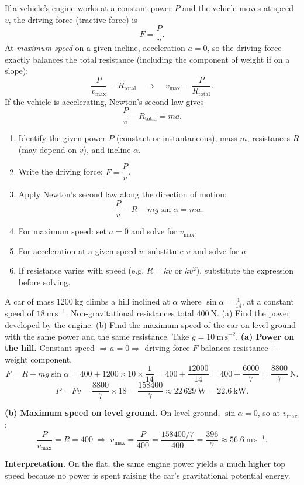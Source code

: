 \documentclass[11pt]{article}
\begin{document}
\begin{propriete}
If a vehicle's engine works at a constant power $P$ and the vehicle moves at speed $v$, the driving force (tractive force) is
\[
F = \frac{P}{v}.
\]
At \emph{maximum speed} on a given incline, acceleration $a = 0$, so the driving force exactly balances the total resistance (including the component of weight if on a slope):
\[
\frac{P}{v_{\max}} = R_{\text{total}} \quad\Longrightarrow\quad v_{\max} = \frac{P}{R_{\text{total}}}.
\]
If the vehicle is accelerating, Newton's second law gives
\[
\frac{P}{v} - R_{\text{total}} = ma.
\]
\end{propriete}

\begin{methode}
\begin{enumerate}
\item Identify the given power $P$ (constant or instantaneous), mass $m$, resistances $R$ (may depend on $v$), and incline $\alpha$.
\item Write the driving force: $F = \dfrac{P}{v}$.
\item Apply Newton's second law along the direction of motion:
\[
\frac{P}{v} - R - mg\sin\alpha = ma.
\]
\item For maximum speed: set $a = 0$ and solve for $v_{\max}$.
\item For acceleration at a given speed $v$: substitute $v$ and solve for $a$.
\item If resistance varies with speed (e.g. $R = kv$ or $kv^2$), substitute the expression before solving.
\end{enumerate}
\end{methode}

\begin{exoresolu}
A car of mass $1200\ \mathrm{kg}$ climbs a hill inclined at $\alpha$ where $\sin\alpha = \frac{1}{14}$, at a constant speed of $18\ \mathrm{m\,s^{-1}}$. Non-gravitational resistances total $400\ \mathrm{N}$. (a) Find the power developed by the engine. (b) Find the maximum speed of the car on level ground with the same power and the same resistance. Take $g = 10\ \mathrm{m\,s^{-2}}$.
\tcblower
\textbf{(a) Power on the hill.} Constant speed $\Rightarrow a=0 \Rightarrow$ driving force $F$ balances resistance + weight component.
\[
F = R + mg\sin\alpha = 400 + 1200 \times 10 \times \frac{1}{14} = 400 + \frac{12000}{14} = 400 + \frac{6000}{7} = \frac{8800}{7}\ \mathrm{N}.
\]
\[
P = Fv = \frac{8800}{7} \times 18 = \frac{158400}{7} \approx 22\,629\ \mathrm{W} = 22.6\ \mathrm{kW}.
\]

\textbf{(b) Maximum speed on level ground.} On level ground, $\sin\alpha = 0$, so at $v_{\max}$:
\[
\frac{P}{v_{\max}} = R = 400 \;\Longrightarrow\; v_{\max} = \frac{P}{400} = \frac{158400/7}{400} = \frac{396}{7} \approx 56.6\ \mathrm{m\,s^{-1}}.
\]

\textbf{Interpretation.} On the flat, the same engine power yields a much higher top speed because no power is spent raising the car's gravitational potential energy.
\end{exoresolu}
\end{document}

